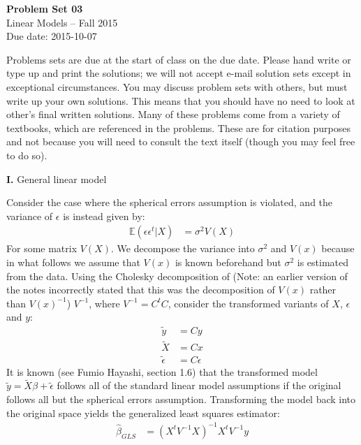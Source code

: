 \documentclass[12pt]{article}
\begin{document}
\begin{center}
{\bf Problem Set 03} \\
Linear Models -- Fall 2015 \\
Due date: 2015-10-07
\end{center}

\medskip

Problems sets are due at the start of class on the due date. Please hand write
or type up and print the solutions; we will not accept e-mail solution sets except
in exceptional circumstances. You may discuss problem sets with others, but must
write up your own solutions. This means that you should have no need to look at other's
final written solutions. Many of these problems come from a variety of textbooks,
which are referenced in the problems. These are for citation purposes and not because
you will need to consult the text itself (though you may feel free to do so).

\medskip

{\bf I.} General linear model

Consider the case where the spherical errors assumption is violated, and
the variance of $\epsilon$ is instead given by:
\begin{align}
\mathbb{E} (\epsilon \epsilon^t | X) &= \sigma^2 V(X) \label{gerr}
\end{align}
For some matrix $V(X)$. We decompose the variance into $\sigma^2$ and $V(x)$ because
in what follows we assume that $V(x)$ is known beforehand but $\sigma^2$ is estimated
from the data. Using the Cholesky decomposition of (Note: an earlier version of the
notes incorrectly stated that this was the decomposition of $V(x)$ rather than $V(x)^{-1}$)
$V^{-1}$, where $V^{-1} = C^t C$, consider
the transformed variants of $X$, $\epsilon$ and $y$:
\begin{align}
\tilde{y} &= Cy \\
\tilde{X} &= Cx \\
\tilde{\epsilon} &= C\epsilon
\end{align}
It is known (see Fumio Hayashi, section 1.6) that the transformed model
$\tilde{y} = \tilde{X}\beta + \tilde{\epsilon}$ follows all of the standard
linear model assumptions if the original follows all but the spherical errors
assumption. Transforming the model back into the original space yields the
generalized least squares estimator:
\begin{align}
\widehat{\beta}_{GLS} &= (X^t V^{-1} X)^{-1} X^t V^{-1} y
\end{align}
\end{document}
